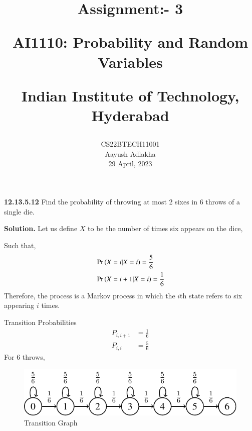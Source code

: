 \documentclass[journal,12pt,twocolumn]{IEEEtran}
\begin{document}
\let\vec\mathbf


\vspace{3cm}

\title{
	Assignment:- 3
 
	\Large AI1110: Probability and Random Variables
 
	\Large Indian Institute of Technology, Hyderabad
}
\author{
	CS22BTECH11001
	
	Aayush Adlakha
 
	29 April, 2023
}






\maketitle

\newpage


\bigskip
\renewcommand{\thefigure}{\theenumi}
\renewcommand{\thetable}{\theenumi}
\textbf{12.13.5.12}
Find the probability of throwing at most 2 sixes in 6 throws of a single die.

\textbf{Solution.}
Let us define $X$ to be the number of times six appears on the dice,

Such that, 
\begin{align}
&\Pr\left(X = i | X = i\right) = \frac{5}{6}\\
&\Pr\left(X = i + 1 | X = i\right) = \frac{1}{6}
\end{align}
Therefore,
the process is a Markov process in which the $i$th state refers to six appearing $i$ times.

Transition Probabilities 
\begin{align}
    P_{i,i+1} &= \frac{1}{6}\\
    P_{i,i} &=\frac{5}{6}
\end{align}
For 6 throws,
\begin{figure}[h!]
    \centering
    \includegraphics[width=\columnwidth]{figs/output-figure0}
    \caption{Transition Graph}
    \label{fig:my_label}
\end{figure}
\end{document}
